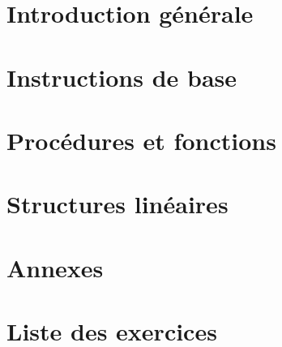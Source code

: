 \documentclass[11pt,a4paper,colorlinks,breaklinks]{book}
\theoremstyle{mybreak}
\begin{document}
\renewcommand{\contentsname}{Sommaire}
\tableofcontents

\chapter{Introduction générale}\label{ch:introduction}
	

\chapter{Instructions de base}\label{ch:instructions}
	

\chapter{Procédures et fonctions}\label{ch:fonctions}
	

\chapter{Structures linéaires}\label{ch:listes}
	




\chapter{Annexes}
	

\chapter*{Liste des exercices}


\label{fin}
\end{document}
